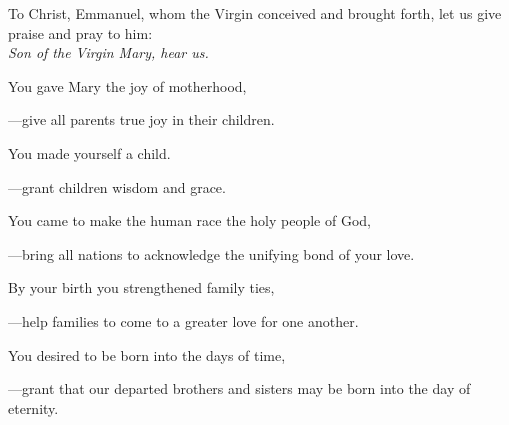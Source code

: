 \intercessions\indent

\begin{hangpar}

To Christ, Emmanuel, whom the Virgin conceived and brought forth, let us give praise and pray to him:\\
\emph{Son of the Virgin Mary, hear us.}

\medskip You gave Mary the joy of motherhood,

{\color{red}---\thinspace}give all parents true joy in their children.

\medskip You made yourself a child.

{\color{red}---\thinspace}grant children wisdom and grace.

\medskip You came to make the human race the holy people of God,

{\color{red}---\thinspace}bring all nations to acknowledge the unifying bond of your love.

\medskip By your birth you strengthened family ties,

{\color{red}---\thinspace}help families to come to a greater love for one another. 

\medskip You desired to be born into the days of time,

{\color{red}---\thinspace}grant that our departed brothers and sisters may be born into the day of eternity.

\medskip

\end{hangpar}
